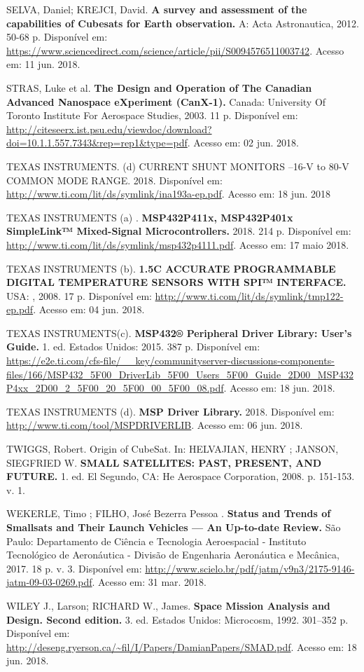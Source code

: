 \noindent SELVA, Daniel; KREJCI, David. \textbf{A survey and assessment of the capabilities of Cubesats for Earth observation. } A: Acta Astronautica, 2012. 50-68 p. Disponível em: \url{https://www.sciencedirect.com/science/article/pii/S0094576511003742}. Acesso em: 11 jun. 2018.

\noindent STRAS, Luke et al. \textbf{The Design and Operation of The Canadian Advanced Nanospace eXperiment (CanX-1). } Canada: University Of Toronto Institute For Aerospace Studies, 2003. 11 p. Disponível em: \url{http://citeseerx.ist.psu.edu/viewdoc/download?doi=10.1.1.557.7343\&rep=rep1\&type=pdf}. Acesso em: 02 jun. 2018.

\noindent TEXAS INSTRUMENTS. (d) CURRENT SHUNT MONITORS –16-V to 80-V COMMON MODE RANGE. 2018. Disponível em: \url{http://www.ti.com/lit/ds/symlink/ina193a-ep.pdf}. Acesso em: 18 jun. 2018

\noindent TEXAS INSTRUMENTS (a) . \textbf{MSP432P411x, MSP432P401x SimpleLink™ Mixed-Signal Microcontrollers.} 2018. 214 p. Disponível em: \url{http://www.ti.com/lit/ds/symlink/msp432p4111.pdf}. Acesso em: 17 maio 2018.

\noindent TEXAS INSTRUMENTS (b). \textbf{1.5C ACCURATE PROGRAMMABLE DIGITAL TEMPERATURE SENSORS WITH SPI™ INTERFACE. } USA: , 2008. 17 p. Disponível em: \url{http://www.ti.com/lit/ds/symlink/tmp122-ep.pdf}. Acesso em: 04 jun. 2018.

\noindent TEXAS INSTRUMENTS(c). \textbf{MSP432® Peripheral Driver Library: User’s Guide.} 1. ed. Estados Unidos: 2015. 387 p. Disponível em: \url{https://e2e.ti.com/cfs-file/__key/communityserver-discussions-components-files/166/MSP432_5F00_DriverLib_5F00_Users_5F00_Guide_2D00_MSP432P4xx_2D00_2_5F00_20_5F00_00_5F00_08.pdf}. Acesso em: 18 jun. 2018.

\noindent TEXAS INSTRUMENTS (d). \textbf{MSP Driver Library.} 2018. Disponível em: \url{http://www.ti.com/tool/MSPDRIVERLIB}. Acesso em: 06 jun. 2018.

\noindent TWIGGS, Robert. Origin of CubeSat. In: HELVAJIAN, HENRY ; JANSON, SIEGFRIED W. \textbf{SMALL SATELLITES: PAST, PRESENT, AND FUTURE. } 1. ed. El Segundo, CA: He Aerospace Corporation, 2008. p. 151-153. v. 1.

\noindent WEKERLE, Timo ; FILHO, José Bezerra Pessoa . \textbf{Status and Trends of Smallsats and Their Launch Vehicles — An Up-to-date Review. } São Paulo: Departamento de Ciência e Tecnologia Aeroespacial - Instituto Tecnológico de Aeronáutica - Divisão de Engenharia Aeronáutica e Mecânica, 2017. 18 p. v. 3. Disponível em: \url{http://www.scielo.br/pdf/jatm/v9n3/2175-9146-jatm-09-03-0269.pdf}. Acesso em: 31 mar. 2018.

\noindent WILEY J., Larson; RICHARD W., James. \textbf{Space Mission Analysis and Design. Second edition. } 3. ed. Estados Unidos: Microcosm, 1992. 301–352 p. Disponível em: \url{http://deseng.ryerson.ca/~fil/I/Papers/DamianPapers/SMAD.pdf}. Acesso em: 18 jun. 2018.
